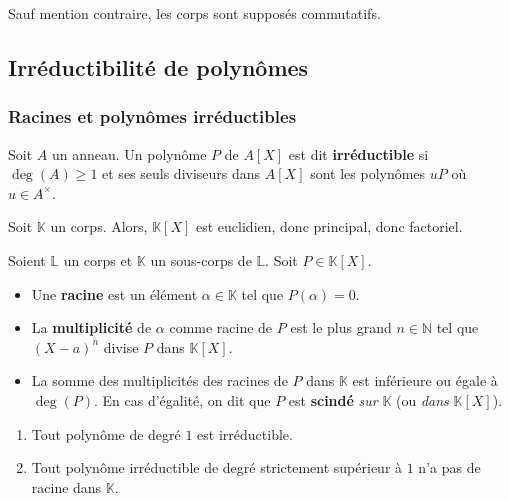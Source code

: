 




  Sauf mention contraire, les corps sont supposés commutatifs.

  \subsection{Irréductibilité de polynômes}

  \subsubsection{Racines et polynômes irréductibles}


  \begin{definition}
    Soit $A$ un anneau. Un polynôme $P$ de $A[X]$ est dit \textbf{irréductible} si $\deg(A) \geq 1$ et ses seuls diviseurs dans $A[X]$ sont les polynômes $uP$ où $u \in A^{\times}$.
  \end{definition}

  \begin{remark}
    Soit $\mathbb{K}$ un corps. Alors, $\mathbb{K}[X]$ est euclidien, donc principal, donc factoriel.
  \end{remark}

  \begin{definition}
    Soient $\mathbb{L}$ un corps et $\mathbb{K}$ un sous-corps de $\mathbb{L}$. Soit $P \in \mathbb{K}[X]$.
    \begin{itemize}
      \item Une \textbf{racine} est un élément $\alpha \in \mathbb{K}$ tel que $P(\alpha) = 0$.
      \item La \textbf{multiplicité} de $\alpha$ comme racine de $P$ est le plus grand $n \in \mathbb{N}$ tel que $(X-a)^n$ divise $P$ dans $\mathbb{K}[X]$.
      \item La somme des multiplicités des racines de $P$ dans $\mathbb{K}$ est inférieure ou égale à $\deg(P)$. En cas d'égalité, on dit que $P$ est \textbf{scindé} \textit{sur} $\mathbb{K}$ (ou \textit{dans} $\mathbb{K}[X]$).
    \end{itemize}
  \end{definition}

  \begin{proposition}
    \label{141-1}
    \begin{enumerate}[label={\bfseries(\roman*)}]
      \item Tout polynôme de degré $1$ est irréductible.
      \item \label{141-2} Tout polynôme irréductible de degré strictement supérieur à $1$ n'a pas de racine dans $\mathbb{K}$.
    \end{enumerate}
  \end{proposition}


